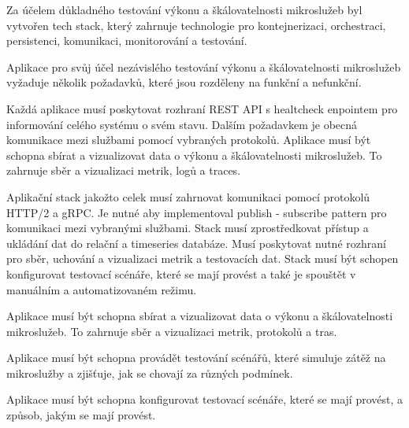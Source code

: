 


Za účelem důkladného testování výkonu a škálovatelnosti mikroslužeb byl vytvořen tech stack, který zahrnuje technologie pro kontejnerizaci, orchestraci, persistenci, komunikaci, monitorování a testování. 


Aplikace pro svůj účel nezávislého testování výkonu a škálovatelnosti mikroslužeb vyžaduje několik požadavků, které jsou rozděleny na funkční a nefunkční.



Každá aplikace musí poskytovat rozhraní REST API s healtcheck enpointem pro informování celého systému o svém stavu. Dalším požadavkem je obecná komunikace mezi službami pomocí vybraných protokolů. Aplikace musí být schopna sbírat a vizualizovat data o výkonu a škálovatelnosti mikroslužeb. To zahrnuje sběr a vizualizaci metrik, logů a traces.



Aplikační stack jakožto celek musí zahrnovat komunikaci pomocí protokolů HTTP/2 a gRPC. Je nutné aby implementoval publish - subscribe pattern pro komunikaci mezi vybranými službami. Stack musí zprostředkovat přístup a ukládání dat do relační a timeseries databáze. Musí poskytovat nutné rozhraní pro sběr, uchování a vizualizaci metrik a testovacích dat. Stack musí být schopen konfigurovat testovací scénáře, které se mají provést a také je spouštět v manuálním a automatizovaném režimu.


Aplikace musí být schopna sbírat a vizualizovat data o výkonu a škálovatelnosti mikroslužeb. To zahrnuje sběr a vizualizaci metrik, protokolů a tras.


Aplikace musí být schopna provádět testování scénářů, které simuluje zátěž na mikroslužby a zjišťuje, jak se chovají za různých podmínek.


Aplikace musí být schopna konfigurovat testovací scénáře, které se mají provést, a způsob, jakým se mají provést.

